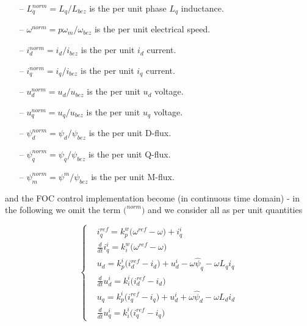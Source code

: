 \documentclass[11pt,a4paper]{article}
\numberwithin{equation}{section}
\theoremstyle{it}
\theoremstyle{definition}
\begin{document}
\begin{onehalfspace}
\begin{itemize}
\begin{itemize}
		\item[--] $L_q^{norm} = L_q/L_{bez}$ is the per unit phase $L_q$ inductance.
		\item[--] $\omega^{norm} = p\omega_m/\omega_{bez}$ is the per unit electrical speed.		
		\item[--] $i_d^{norm} = i_d/i_{bez}$ is the per unit $i_d$ current.
		\item[--] $i_q^{norm} = i_q/i_{bez}$ is the per unit $i_q$ current.
		\item[--] $u_d^{norm} = u_d/u_{bez}$ is the per unit $u_d$ voltage.
		\item[--] $u_q^{norm} = u_q/u_{bez}$ is the per unit $u_q$ voltage.		
		\item[--] $\psi_d^{norm} = \psi_d/\psi_{bez}$ is the per unit D-flux.
		\item[--] $\psi_q^{norm} = \psi_q/\psi_{bez}$ is the per unit Q-flux.
		\item[--] $\psi_m^{norm} = \psi^m/\psi_{bez}$ is the per unit M-flux.
		\end{itemize}	 
\end{itemize}
and the FOC control implementation become (in continuous time domain) - in the following we omit the term $\Big(^{norm}\Big)$ and we consider all as per unit quantities
\begin{mybox}
\begin{equation}
	\left\lbrace \begin{aligned}
		&i_q^{ref} = k_p^w\Big(\omega^{ref} - \omega\Big) + i_{q}^{i} \\[6pt]
		&\frac{d}{dt} i_{q}^{i}= k_i^w\Big(\omega^{ref} - \omega\Big) \\[6pt]
		&u_d =  k_p^i\Big(i_d^{ref} - i_d\Big) + u_d^i - \omega\hat{\psi}_q - \omega L_q i_q \\[6pt]
		&\frac{d}{dt} u_d^i= k_i^i\Big(i_d^{ref} - i_d\Big)\\[6pt]
		&u_q =  k_p^i\Big(i_q^{ref} - i_q\Big) + u_d^i + \omega\hat{\psi}_d - \omega L_d i_d \\[6pt]
		&\frac{d}{dt} u_q^i= k_i^i\Big(i_q^{ref} - i_q\Big)
	\end{aligned}\right. 
\end{equation}
\end{mybox}


\end{onehalfspace}
\end{document}
